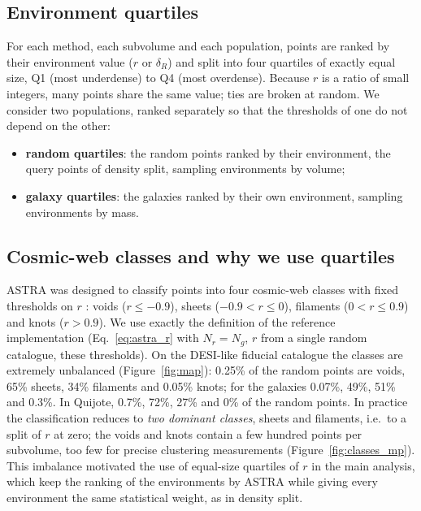\subsection{Environment quartiles}

For each method, each subvolume and each population, points are ranked by their environment value ($r$ or $\delta_R$) and split into four quartiles of exactly equal size, Q1 (most underdense) to Q4 (most overdense). Because $r$ is a ratio of small integers, many points share the same value; ties are broken at random. We consider two populations, ranked separately so that the thresholds of one do not depend on the other:
\begin{itemize}
\item \textbf{random quartiles}: the random points ranked by their environment, the query points of density split, sampling environments by volume;
\item \textbf{galaxy quartiles}: the galaxies ranked by their own environment, sampling environments by mass.
\end{itemize}

\subsection{Cosmic-web classes and why we use quartiles}
\label{sec:classes_def}

ASTRA was designed to classify points into four cosmic-web classes with fixed thresholds on $r$ \cite{ASTRA}: voids ($r\le-0.9$), sheets ($-0.9<r\le0$), filaments ($0<r\le0.9$) and knots ($r>0.9$). We use exactly the definition of the reference implementation (Eq.~\ref{eq:astra_r} with $N_r=N_g$, $r$ from a single random catalogue, these thresholds). On the DESI-like fiducial catalogue the classes are extremely unbalanced (Figure~\ref{fig:map}): 0.25\% of the random points are voids, 65\% sheets, 34\% filaments and 0.05\% knots; for the galaxies 0.07\%, 49\%, 51\% and 0.3\%. In Quijote, 0.7\%, 72\%, 27\% and 0\% of the random points. In practice the classification reduces to \emph{two dominant classes}, sheets and filaments, i.e.\ to a split of $r$ at zero; the voids and knots contain a few hundred points per subvolume, too few for precise clustering measurements (Figure~\ref{fig:classes_mp}). This imbalance motivated the use of equal-size quartiles of $r$ in the main analysis, which keep the ranking of the environments by ASTRA while giving every environment the same statistical weight, as in density split.

